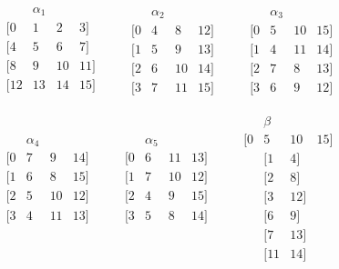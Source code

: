 \[
\begin{matrix}
& \alpha_1 &&\\
  [0 & 1 & 2 & 3]\\
  [4 & 5 & 6 & 7]\\
  [8 & 9 & 10 & 11]\\
  [12 & 13 & 14 & 15]\\
\end{matrix}
\qquad
\begin{matrix}
& \alpha_2 &&\\
  [0 &   4 &   8 & 12]\\
  [1 &   5 &   9 & 13]\\
  [2 &   6 & 10 & 14]\\
  [3 &   7 & 11 & 15]
\end{matrix}
\qquad
\begin{matrix}
& \alpha_3 &&\\
  [0 &   5 &  10 & 15]\\
  [1 &   4 &  11 & 14]\\
  [2 &   7 & 8 & 13]\\
  [3 &   6 & 9 & 12]
\end{matrix}
\]

\vskip5mm

\[
\begin{matrix}
& \alpha_4 &&\\
  [0 &   7 & 9 & 14]\\
  [1 &   6 & 8 & 15]\\
  [2 &   5 & 10 & 12]\\
  [3 &   4 & 11 & 13]\\
&&&\\
&&&\\
&&&
\end{matrix}
\qquad
\begin{matrix}
& \alpha_5 &&\\
  [0 &   6 & 11 & 13]\\
  [1 &   7 & 10 & 12]\\
  [2 &   4 & 9 & 15]\\
  [3 &   5 & 8 & 14]\\
&&&\\
&&&\\
&&&
\end{matrix}
\qquad
\begin{matrix}
& \beta &&\\
  [0 &   5 &  10 & 15]\\
&  [1 &   4] & \\
&  [2 & 8] &\\
&  [3 &   12] & \\
& [6 & 9] & \\
&  [7 & 13] &\\
& [11 & 14] & 
\end{matrix}
\]

